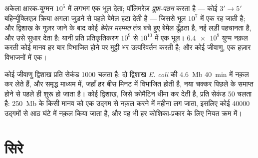 \begin{proposition}[सत्यनिष्ठा]\label{prop:b1:replication-mitosis:fidelity}
अकेला क्षारक-युग्मन $10^5$ में लगभग एक भूल देता; पॉलिमरेज़
\emph{प्रूफ़-पठन} करता है --- कोई $3' \to 5'$ बहिर्न्यूक्लिएज़ क्रिया
अगला  जुड़ने से पहले बेमेल  हटा देती है ---
जिससे भूल $10^7$ में एक रह जाती है; और द्विशाख के गुज़र जाने के बाद कोई
\emph{बेमेल मरम्मत} तंत्र बचे हुए बेमेल ढूँढ़ता है, नई लड़ी पहचानता है,
और उसे सुधार देता है: यानी प्रति प्रतिकृतिकरण $10^9$ से $10^{10}$  में एक भूल। $\num{6.4e9}$ युग्म नक़ल करती कोई मानव  हर बार
विभाजित होने पर मुट्ठी भर उत्परिवर्तन करती है; और कोई जीवाणु, एक हज़ार
विभाजनों में एक।
\end{proposition}

\begin{example}[चाल और आरंभ-बिंदु]\label{ex:b1:replication-mitosis:speed}
कोई जीवाणु द्विशाख प्रति सेकंड \qty{1000}{}  चलता है: दो
द्विशाख \emph{E. coli} की \qty{4.6}{Mb} \qty{40}{min} में नक़ल कर लेते
हैं, और समृद्ध माध्यम में, जहाँ  हर बीस मिनट में विभाजित होती है,
नया चक्कर पिछले के समाप्त होने से पहले ही शुरू हो जाता है। कोई 
द्विशाख, जिसे क्रोमैटिन धीमा कर देती है, प्रति सेकंड \qty{50}{} चलता है:
\qty{250}{Mb} के किसी मानव  को एक उद्गम से नक़ल करने में महीना लग
जाता, इसलिए  कोई \num{40000} उद्गमों से आठ घंटे में नक़ल किया जाता
है, और वह भी हर कोशिका-प्रकार के लिए नियत क्रम में।
\end{example}

\section{सिरे}


